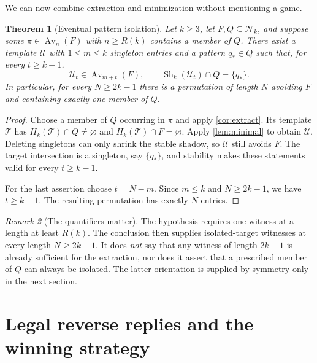 \documentclass[11pt,a4paper]{article}
\newtheorem{theorem}{Theorem}[section]
\theoremstyle{definition}
\theoremstyle{remark}
\newtheorem{remark}[theorem]{Remark}
\DeclareMathOperator{\Av}{Av}
\DeclareMathOperator{\Sh}{Sh}
\newcommand{\Nk}{\mathcal N_k}
\newcommand{\Tm}{\mathcal T}
\newcommand{\Um}{\mathcal U}
\newcommand{\replybound}{R(k)}
\begin{document}
We can now combine extraction and minimization without mentioning a game.

\begin{theorem}[Eventual pattern isolation]\label{thm:isolation}
Let $k\ge3$, let $F,Q\subseteq\Nk$, and suppose some
$\pi\in\Av_n(F)$ with $n\ge\replybound$ contains a member of $Q$.
There exist a template $\Um$ with $1\le m\le k$ singleton entries and a
pattern $q_*\in Q$ such that, for every $t\ge k-1$,
\begin{equation}\label{eq:universal-isolation}
 \Um_t\in\Av_{m+t}(F),\qquad
 \Sh_k(\Um_t)\cap Q=\{q_*\}.
\end{equation}
In particular, for every $N\ge2k-1$ there is a permutation of length $N$
avoiding $F$ and containing exactly one member of $Q$.
\end{theorem}
\begin{proof}
Choose a member of $Q$ occurring in $\pi$ and apply \cref{cor:extract}.
Its template $\Tm$ has $H_k(\Tm)\cap Q\ne\varnothing$ and
$H_k(\Tm)\cap F=\varnothing$. Apply \cref{lem:minimal} to obtain $\Um$.
Deleting singletons can only shrink the stable shadow, so $\Um$ still avoids
$F$. The target intersection is a singleton, say $\{q_*\}$, and stability
makes these statements valid for every $t\ge k-1$.

For the last assertion choose $t=N-m$. Since $m\le k$ and $N\ge2k-1$,
we have $t\ge k-1$. The resulting permutation has exactly $N$ entries.
\end{proof}

\begin{remark}[The quantifiers matter]
The hypothesis requires one witness at a length at least $\replybound$.
The conclusion then supplies isolated-target witnesses at every length
$N\ge2k-1$. It does \emph{not} say that any witness of length $2k-1$ is
already sufficient for the extraction, nor does it assert that a prescribed
member of $Q$ can always be isolated. The latter orientation is supplied by
symmetry only in the next section.
\end{remark}

\section{Legal reverse replies and the winning strategy}
\label{sec:gameproof}
\end{document}
